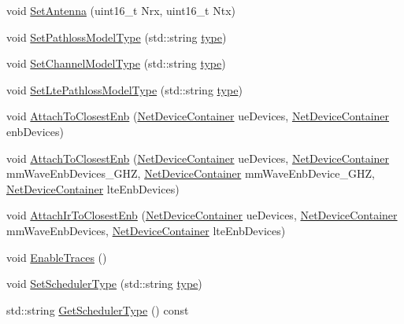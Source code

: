\begin{DoxyCompactItemize}
\item 
void \hyperlink{classns3_1_1MmWaveHelper_a1314b4ff78c9cc2a3bbdaee42d374277}{Set\+Antenna} (uint16\+\_\+t Nrx, uint16\+\_\+t Ntx)
\item 
void \hyperlink{classns3_1_1MmWaveHelper_a06ba80bdb947494937d88293085fdae3}{Set\+Pathloss\+Model\+Type} (std\+::string \hyperlink{visualizer-ideas_8txt_add98db9e15e2a58cf2b57623e7aa893a}{type})
\item 
void \hyperlink{classns3_1_1MmWaveHelper_a9ea4a1719352f4f98f97981782c4a5e0}{Set\+Channel\+Model\+Type} (std\+::string \hyperlink{visualizer-ideas_8txt_add98db9e15e2a58cf2b57623e7aa893a}{type})
\item 
void \hyperlink{classns3_1_1MmWaveHelper_a0d7e7e72d52ada814b43c0378505993f}{Set\+Lte\+Pathloss\+Model\+Type} (std\+::string \hyperlink{visualizer-ideas_8txt_add98db9e15e2a58cf2b57623e7aa893a}{type})
\item 
void \hyperlink{classns3_1_1MmWaveHelper_a202baea67b0af0d4fb6069de73766dc6}{Attach\+To\+Closest\+Enb} (\hyperlink{classns3_1_1NetDeviceContainer}{Net\+Device\+Container} ue\+Devices, \hyperlink{classns3_1_1NetDeviceContainer}{Net\+Device\+Container} enb\+Devices)
\item 
void \hyperlink{classns3_1_1MmWaveHelper_a3a6721f4d496581df38be0f415738fa5}{Attach\+To\+Closest\+Enb} (\hyperlink{classns3_1_1NetDeviceContainer}{Net\+Device\+Container} ue\+Devices, \hyperlink{classns3_1_1NetDeviceContainer}{Net\+Device\+Container} mm\+Wave\+Enb\+Devices\+\_\+G\+HZ, \hyperlink{classns3_1_1NetDeviceContainer}{Net\+Device\+Container} mm\+Wave\+Enb\+Device\+\_\+G\+HZ, \hyperlink{classns3_1_1NetDeviceContainer}{Net\+Device\+Container} lte\+Enb\+Devices)
\item 
void \hyperlink{classns3_1_1MmWaveHelper_ac3583459711ca8e019f1a6e58ec37c1f}{Attach\+Ir\+To\+Closest\+Enb} (\hyperlink{classns3_1_1NetDeviceContainer}{Net\+Device\+Container} ue\+Devices, \hyperlink{classns3_1_1NetDeviceContainer}{Net\+Device\+Container} mm\+Wave\+Enb\+Devices, \hyperlink{classns3_1_1NetDeviceContainer}{Net\+Device\+Container} lte\+Enb\+Devices)
\item 
void \hyperlink{classns3_1_1MmWaveHelper_a4eae3871876b62965d612d9a56ed21bc}{Enable\+Traces} ()
\item 
void \hyperlink{classns3_1_1MmWaveHelper_ae38f5e96d749ab63dda7746f43dfbe84}{Set\+Scheduler\+Type} (std\+::string \hyperlink{visualizer-ideas_8txt_add98db9e15e2a58cf2b57623e7aa893a}{type})
\item 
std\+::string \hyperlink{classns3_1_1MmWaveHelper_ab4b78464bef4498dc6f7a9a293014587}{Get\+Scheduler\+Type} () const 

\end{DoxyCompactItemize}
